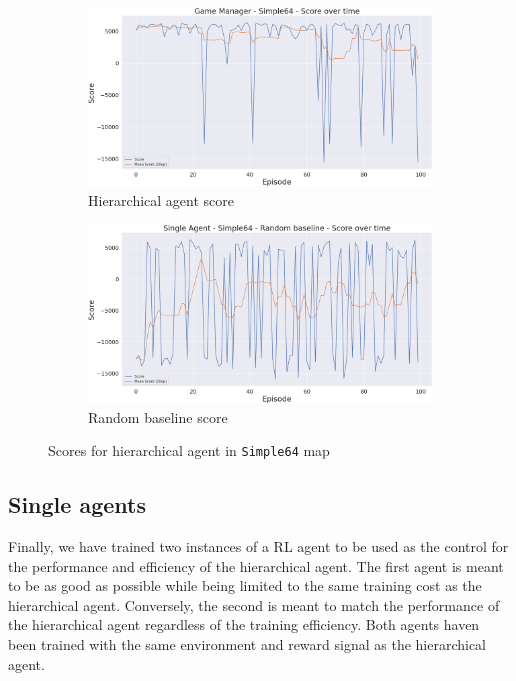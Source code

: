 \begin{figure}[t]
    \centering
    \begin{subfigure}[b]{0.495\textwidth}
        \includegraphics[width=1\textwidth]{figs/multi_dqn_game_manager/exploit/score.png}
        \caption{Hierarchical agent score}
    \end{subfigure}
    \begin{subfigure}[b]{0.495\textwidth}
        \includegraphics[width=1\textwidth]{figs/single_random/exploit/score.png}
        \caption{Random baseline score}
    \end{subfigure}
    \caption{Scores for hierarchical agent in \texttt{Simple64} map}
    \label{fig:hierarchical_Simple64_scores}
\end{figure}

\subsection{Single agents}

Finally, we have trained two instances of a RL agent to be used as the control for the performance and efficiency of the hierarchical agent. The first agent is meant to be as good as possible while being limited to the same training cost as the hierarchical agent. Conversely, the second is meant to match the performance of the hierarchical agent regardless of the training efficiency. Both agents haven been trained with the same environment and reward signal as the hierarchical agent.

